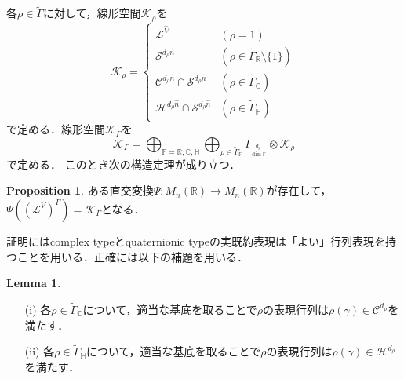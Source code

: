 \documentclass[11pt]{article}
\theoremstyle{definition}
\newtheorem{lemma}[defi]{Lemma}
\newtheorem{prop}[defi]{Proposition}
\begin{document}
    各$\rho \in \tilde{\Gamma}$に対して，線形空間$\mathcal{K}_\rho$を
    \[
        \mathcal{K}_\rho = 
        \begin{cases}
            \mathcal{L}^{\hat{V}} & (\rho=1) \\
            \mathcal{S}^{d_\rho \hat{n}} & (\rho \in \tilde{\Gamma}_\mathbb{R} \setminus \{1\}) \\
            \mathcal{C}^{d_\rho \hat{n}} \cap \mathcal{S}^{d_\rho \hat{n}} & (\rho \in \tilde{\Gamma}_\mathbb{C})  \\
            \mathcal{H}^{d_\rho \hat{n}} \cap \mathcal{S}^{d_\rho \hat{n}} & (\rho \in \tilde{\Gamma}_\mathbb{H})
        \end{cases}
    \]
    で定める．線形空間$\mathcal{K}_\Gamma$を
    \[
        \mathcal{K}_\Gamma=\bigoplus_{\mathbb{F}= \mathbb{R}, \mathbb{C}, \mathbb{H}} \bigoplus_{\rho \in \tilde{\Gamma}_\mathbb{F}}
        I_{ \frac{d_\rho}{\dim \mathbb{F}}} \otimes \mathcal{K}_\rho
    \]
    で定める．
    このとき次の構造定理が成り立つ．
    \begin{prop}\label{prop:str2}
        ある直交変換$\Psi:M_n(\mathbb{R}) \rightarrow M_n(\mathbb{R})$が存在して，$\Psi((\mathcal{L}^V)^\Gamma) =\mathcal{K}_\Gamma$となる．
    \end{prop}
    証明にはcomplex typeとquaternionic typeの実既約表現は「よい」行列表現を持つことを用いる．正確には以下の補題を用いる．
    \begin{lemma} \label{lem:good}
        \begin{itemize}
            \item[(i)] 各$\rho \in \tilde{\Gamma}_\mathbb{C}$について，適当な基底を取ることで$\rho$の表現行列は$\rho(\gamma) \in \mathcal{C}^{d_\rho}$を満たす．
            \item[(ii)] 各$\rho \in \tilde{\Gamma}_\mathbb{H}$について，適当な基底を取ることで$\rho$の表現行列は$\rho(\gamma) \in \mathcal{H}^{d_\rho}$を満たす．
        \end{itemize}
    \end{lemma}
\end{document}
